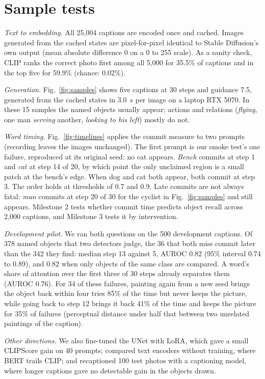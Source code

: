 \documentclass[conference]{IEEEtran}
\begin{document}
\section{Sample tests}
\emph{Text to embedding.} All 25{,}004 captions are encoded once and cached. Images generated from the cached states are pixel-for-pixel identical to Stable Diffusion's own output (mean absolute difference 0 on a 0 to 255 scale). As a sanity check, CLIP ranks the correct photo first among all 5{,}000 for 35.5\% of captions and in the top five for 59.9\% (chance: 0.02\%).

\emph{Generation.} Fig.~\ref{fig:samples} shows five captions at 30 steps and guidance 7.5, generated from the cached states in 3.0~s per image on a laptop RTX 5070. In these 15 samples the named objects usually appear; actions and relations (\emph{flying}, one man \emph{serving} another, \emph{looking to his left}) mostly do not.

\emph{Word timing.} Fig.~\ref{fig:timelines} applies the commit measure to two prompts (recording leaves the images unchanged). The first prompt is our smoke test's one failure, reproduced at its original seed: no cat appears. \emph{Bench} commits at step 1 and \emph{cat} at step 14 of 20, by which point the only unclaimed region is a small patch at the bench's edge. When dog and cat both appear, both commit at step 3. The order holds at thresholds of 0.7 and 0.9. Late commits are not always fatal: \emph{man} commits at step 20 of 30 for the cyclist in Fig.~\ref{fig:samples} and still appears. Milestone 2 tests whether commit time predicts object recall across 2{,}000 captions, and Milestone 3 tests it by intervention.

\emph{Development pilot.} We ran both questions on the 500 development captions. Of 378 named objects that two detectors judge, the 36 that both miss commit later than the 342 they find: median step 13 against 5, AUROC 0.82 (95\% interval 0.74 to 0.89), and 0.82 when only objects of the same class are compared. A word's share of attention over the first three of 30 steps already separates them (AUROC 0.76). For 34 of these failures, painting again from a new seed brings the object back within four tries 85\% of the time but never keeps the picture, while going back to step 12 brings it back 41\% of the time and keeps the picture for 35\% of failures (perceptual distance under half that between two unrelated paintings of the caption).

\emph{Other directions.} We also fine-tuned the UNet with LoRA, which gave a small CLIPScore gain on 40 prompts; compared text encoders without training, where BERT trails CLIP; and recaptioned 100 test photos with a captioning model, where longer captions gave no detectable gain in the objects drawn.
\end{document}
